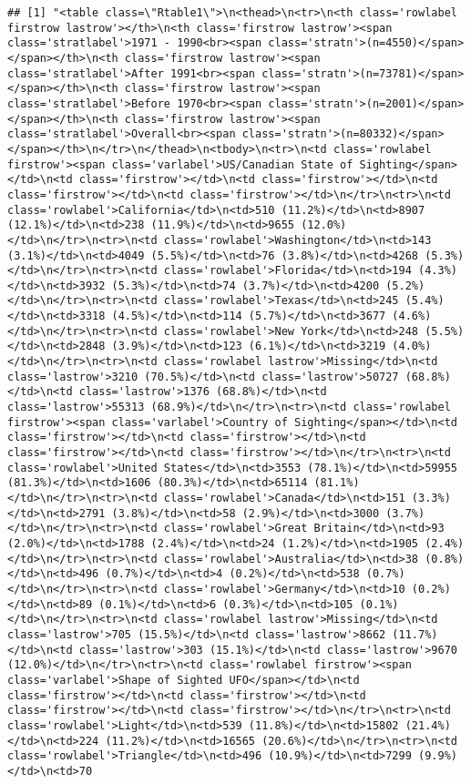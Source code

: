 \documentclass[
]{article}
\begin{document}
\begin{verbatim}
## [1] "<table class=\"Rtable1\">\n<thead>\n<tr>\n<th class='rowlabel firstrow lastrow'></th>\n<th class='firstrow lastrow'><span class='stratlabel'>1971 - 1990<br><span class='stratn'>(n=4550)</span></span></th>\n<th class='firstrow lastrow'><span class='stratlabel'>After 1991<br><span class='stratn'>(n=73781)</span></span></th>\n<th class='firstrow lastrow'><span class='stratlabel'>Before 1970<br><span class='stratn'>(n=2001)</span></span></th>\n<th class='firstrow lastrow'><span class='stratlabel'>Overall<br><span class='stratn'>(n=80332)</span></span></th>\n</tr>\n</thead>\n<tbody>\n<tr>\n<td class='rowlabel firstrow'><span class='varlabel'>US/Canadian State of Sighting</span></td>\n<td class='firstrow'></td>\n<td class='firstrow'></td>\n<td class='firstrow'></td>\n<td class='firstrow'></td>\n</tr>\n<tr>\n<td class='rowlabel'>California</td>\n<td>510 (11.2%)</td>\n<td>8907 (12.1%)</td>\n<td>238 (11.9%)</td>\n<td>9655 (12.0%)</td>\n</tr>\n<tr>\n<td class='rowlabel'>Washington</td>\n<td>143 (3.1%)</td>\n<td>4049 (5.5%)</td>\n<td>76 (3.8%)</td>\n<td>4268 (5.3%)</td>\n</tr>\n<tr>\n<td class='rowlabel'>Florida</td>\n<td>194 (4.3%)</td>\n<td>3932 (5.3%)</td>\n<td>74 (3.7%)</td>\n<td>4200 (5.2%)</td>\n</tr>\n<tr>\n<td class='rowlabel'>Texas</td>\n<td>245 (5.4%)</td>\n<td>3318 (4.5%)</td>\n<td>114 (5.7%)</td>\n<td>3677 (4.6%)</td>\n</tr>\n<tr>\n<td class='rowlabel'>New York</td>\n<td>248 (5.5%)</td>\n<td>2848 (3.9%)</td>\n<td>123 (6.1%)</td>\n<td>3219 (4.0%)</td>\n</tr>\n<tr>\n<td class='rowlabel lastrow'>Missing</td>\n<td class='lastrow'>3210 (70.5%)</td>\n<td class='lastrow'>50727 (68.8%)</td>\n<td class='lastrow'>1376 (68.8%)</td>\n<td class='lastrow'>55313 (68.9%)</td>\n</tr>\n<tr>\n<td class='rowlabel firstrow'><span class='varlabel'>Country of Sighting</span></td>\n<td class='firstrow'></td>\n<td class='firstrow'></td>\n<td class='firstrow'></td>\n<td class='firstrow'></td>\n</tr>\n<tr>\n<td class='rowlabel'>United States</td>\n<td>3553 (78.1%)</td>\n<td>59955 (81.3%)</td>\n<td>1606 (80.3%)</td>\n<td>65114 (81.1%)</td>\n</tr>\n<tr>\n<td class='rowlabel'>Canada</td>\n<td>151 (3.3%)</td>\n<td>2791 (3.8%)</td>\n<td>58 (2.9%)</td>\n<td>3000 (3.7%)</td>\n</tr>\n<tr>\n<td class='rowlabel'>Great Britain</td>\n<td>93 (2.0%)</td>\n<td>1788 (2.4%)</td>\n<td>24 (1.2%)</td>\n<td>1905 (2.4%)</td>\n</tr>\n<tr>\n<td class='rowlabel'>Australia</td>\n<td>38 (0.8%)</td>\n<td>496 (0.7%)</td>\n<td>4 (0.2%)</td>\n<td>538 (0.7%)</td>\n</tr>\n<tr>\n<td class='rowlabel'>Germany</td>\n<td>10 (0.2%)</td>\n<td>89 (0.1%)</td>\n<td>6 (0.3%)</td>\n<td>105 (0.1%)</td>\n</tr>\n<tr>\n<td class='rowlabel lastrow'>Missing</td>\n<td class='lastrow'>705 (15.5%)</td>\n<td class='lastrow'>8662 (11.7%)</td>\n<td class='lastrow'>303 (15.1%)</td>\n<td class='lastrow'>9670 (12.0%)</td>\n</tr>\n<tr>\n<td class='rowlabel firstrow'><span class='varlabel'>Shape of Sighted UFO</span></td>\n<td class='firstrow'></td>\n<td class='firstrow'></td>\n<td class='firstrow'></td>\n<td class='firstrow'></td>\n</tr>\n<tr>\n<td class='rowlabel'>Light</td>\n<td>539 (11.8%)</td>\n<td>15802 (21.4%)</td>\n<td>224 (11.2%)</td>\n<td>16565 (20.6%)</td>\n</tr>\n<tr>\n<td class='rowlabel'>Triangle</td>\n<td>496 (10.9%)</td>\n<td>7299 (9.9%)</td>\n<td>70 
\end{verbatim}
\end{document}
